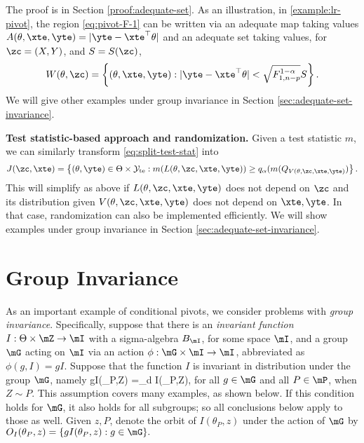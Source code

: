 \documentclass[english]{article}
\begin{document}
The proof is in Section \ref{proof:adequate-set}. 
As an illustration, 
in \cref{example:lr-pivot},
the region \eqref{eq:pivot-F-1} 
can be written via 
an adequate 
map taking values 
$A(\theta,\xte,\yte) = |\yte - \xte^\top \theta|$
and an adequate 
set taking values, 
for $\zc  = (X,Y)$, and $S = S(\zc)$,
\begin{align}
    W(\theta,\zc) = \left\{ (\theta,\xte,\yte):   |\yte - \xte^\top \theta| < \sqrt{F_{1,n-p}^{1 - \alpha}}S \right\}.
    \end{align}
We will give other examples under group invariance in Section \ref{sec:adequate-set-invariance}.

{\bf Test statistic-based approach and randomization.}
Given a test statistic $m$, we can similarly transform \eqref{eq:split-test-stat}
into
\begin{align*}%
    J(\zc,\xte)= \left\{(\theta, \yte) 
\in\Theta\times \mathcal{Y}_{\mathrm{te}}: 
m(L(\theta,\zc,\xte,\yte)) \ge q_{\alpha}(m(Q_{V(\theta,\zc,\xte,\yte)}) \right\}.
\end{align*}
This will simplify as above if
$L(\theta,\zc,\xte,\yte)$ 
does not depend on $\zc$ and
its distribution 
given $V(\theta,\zc,\xte,\yte)$ does not depend on $\xte,\yte$. 
In that case, randomization can also be implemented efficiently.
We will show examples under group invariance
in Section \ref{sec:adequate-set-invariance}.


\section{Group Invariance}\label{sec:conditional-invariance}

As an important example of conditional pivots, 
we consider problems with \emph{group invariance}.
Specifically, suppose that there is an \emph{invariant function} $I:\Theta \times \mZ \to \mI$
with a sigma-algebra $B_{\mI}$, 
for some space $\mI$,
and a group $\mG$
acting on $\mI$ via an action $\phi:\mG\times \mI \to \mI$, abbreviated as $\phi(g,I) = gI$.
Suppose that the function $I$ is invariant in distribution under the group $\mG$, namely
\beq\label{if}
gI(\theta_P,Z) =_d I(\theta_P,Z),
\eeq
for all $g\in \mG$ and all $P \in \mP$, when $Z\sim P$.
This assumption covers many examples, as shown below.
If this condition holds for $\mG$, it also holds for all subgroups; so all conclusions below apply to those as well.
Given $z,P$, denote the orbit of $I(\theta_P,z)$ 
under the action of $\mG$
by
$O_I(\theta_P,z) = \{gI(\theta_P,z): g\in \mG \}.$
\end{document}
